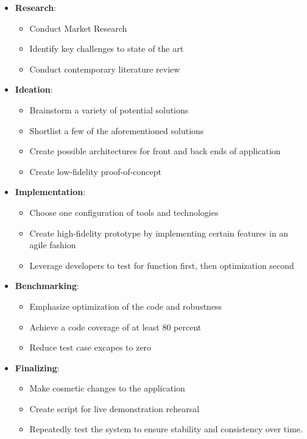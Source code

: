 \documentclass[conference]{IEEEtran}
\begin{document}
\begin{itemize}
      \item \textbf{Research}:
            \begin{itemize}
                  \item Conduct Market Research
                  \item Identify key challenges to state of the art
                  \item Conduct contemporary literature review
            \end{itemize}
      \item \textbf{Ideation}:
            \begin{itemize}
                  \item Brainstorm a variety of potential solutions
                  \item Shortlist a few of the aforementioned solutions
                  \item Create possible architectures for front and back ends of application
                  \item Create low-fidelity proof-of-concept
            \end{itemize}
      \item \textbf{Implementation}:
            \begin{itemize}
                  \item Choose one configuration of tools and technologies
                  \item Create high-fidelity prototype by implementing certain
                        features in an agile fashion
                  \item Leverage developers to test for function first,
                        then optimization second
            \end{itemize}
      \item \textbf{Benchmarking}:
            \begin{itemize}
                  \item Emphasize optimization of the code and robustness
                  \item Achieve a code coverage of at least 80 percent
                  \item Reduce test case excapes to zero
            \end{itemize}
      \item \textbf{Finalizing}:
            \begin{itemize}
                  \item Make cosmetic changes to the application
                  \item Create script for live demonstration rehearsal
                  \item Repeatedly test the system to ensure stability and consistency over time.
            \end{itemize}
\end{itemize}
\end{document}
